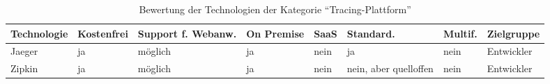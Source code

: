 \begin{table}[H]%
\centering
\addtolength{\leftskip}{-2cm}
\addtolength{\rightskip}{-2cm}
\begin{tabular}{|p{3.05cm}|p{1.8cm}|p{1.7cm}|p{1.2cm}|p{1.3cm}|p{1.7cm}|p{1.3cm}|p{2.6cm}|}
\hline
Technologie & Kostenfrei & Support f. Webanw. & On \mbox{Premise} & SaaS & Standard. & Multif. & Zielgruppe \\
\hline
Jaeger & ja & möglich & ja & nein & ja & nein & Entwickler \\
\hline
Zipkin & ja & möglich & ja & nein & nein, aber quelloffen & nein & Entwickler \\
\hline
\end{tabular}
\caption{Bewertung der Technologien der Kategorie \enquote{Tracing-Plattform}}
\label{tab:technologie-bewertung-tracing-plattform}
\end{table}
